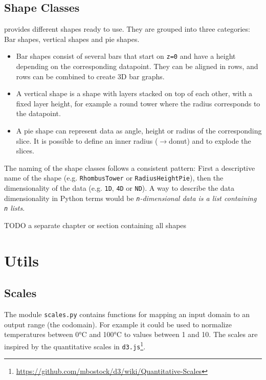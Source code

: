 \subsection{Shape Classes}

\tangible{} provides different shapes ready to use. They are grouped into three
categories: Bar shapes, vertical shapes and  pie shapes.

\begin{itemize}
	\item Bar shapes consist of several bars that start on \texttt{z=0} and have a
		height depending on the corresponding datapoint. They can be aligned in
		rows, and rows can be combined to create 3D bar graphs.
	\item A vertical shape is a shape with layers stacked on top of each other,
		with a fixed layer height, for example a round tower where the radius
		corresponds to the datapoint.
	\item A pie shape can represent data as angle, height or radius of the
		corresponding slice. It is possible to define an inner radius ($\rightarrow$donut) and
		to explode the slices.
\end{itemize}

\noindent The naming of the shape classes follows a consistent pattern: First a
descriptive name of the shape (e.g. \texttt{RhombusTower} or
\texttt{RadiusHeightPie}), then the dimensionality of the data (e.g.
\texttt{1D}, \texttt{4D} or \texttt{ND}). A way to describe the data
dimensionality in Python terms would be \emph{\texttt{n}-dimensional data is a
list containing \texttt{n} lists}.

TODO a separate chapter or section containing all shapes


\section{Utils}\label{sec:utils}

\subsection{Scales}

The module \texttt{scales.py} contains functions for mapping an input domain to
an output range (the codomain). For example it could be used to normalize
temperatures between 0\si{\degree}C and 100\si{\degree}C to values between 1 and
10. The scales are inspired by the quantitative scales in
\texttt{d3.js}\footnote{\url{https://github.com/mbostock/d3/wiki/Quantitative-Scales}}.

